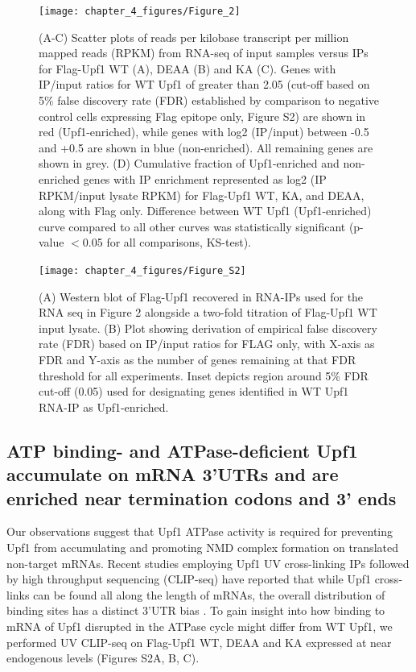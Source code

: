 \begin{figure}[ht]
  \centering
  \texttt{[image: chapter\_4\_figures/Figure\_2]}
  \caption[Figure 1. Selectivity in mRNA association is lost on a transcriptome-wide level in Upf1 ATP binding- and ATP hydrolysis-deficient mutants]{(A-C) Scatter plots of reads per kilobase transcript per million mapped reads (RPKM) from RNA-seq of input samples versus IPs for Flag-Upf1 WT (A), DEAA (B) and KA (C). Genes with IP/input ratios for WT Upf1 of greater than 2.05 (cut-off based on 5\% false discovery rate (FDR) established by comparison to negative control cells expressing Flag epitope only, Figure S2) are shown in red (Upf1-enriched), while genes with log2 (IP/input) between -0.5 and +0.5 are shown in blue (non-enriched). All remaining genes are shown in grey. (D) Cumulative fraction of Upf1-enriched and non-enriched genes with IP enrichment represented as log2 (IP RPKM/input lysate RPKM) for Flag-Upf1 WT, KA, and DEAA, along with Flag only. Difference between WT Upf1 (Upf1-enriched) curve compared to all other curves was statistically significant (p-value $<$0.05 for all comparisons, KS-test). }
  \label{fig:Figure_1}
  \end{figure}

\begin{figure}[ht]
  \centering
  \texttt{[image: chapter\_4\_figures/Figure\_S2]}
  \caption[Supplementary Figure 1. Supplemental data related to RIP-RNAseq]{(A) Western blot of Flag-Upf1 recovered in RNA-IPs used for the RNA seq in Figure 2 alongside a two-fold titration of Flag-Upf1 WT input lysate. (B) Plot showing derivation of empirical false discovery rate (FDR) based on IP/input ratios for FLAG only, with X-axis as FDR and Y-axis as the number of genes remaining at that FDR threshold for all experiments. Inset depicts region around 5\% FDR cut-off (0.05) used for designating genes identified in WT Upf1 RNA-IP as Upf1-enriched. }
  \label{fig:Figure_S1}
\end{figure}

\subsection{ATP binding- and ATPase-deficient Upf1 accumulate on mRNA 3’UTRs and are enriched near termination codons and 3’ ends}
Our observations suggest that Upf1 ATPase activity is required for preventing Upf1 from accumulating and promoting NMD complex formation on translated non-target mRNAs. Recent studies employing Upf1 UV cross-linking IPs followed by high throughput sequencing (CLIP-seq) have reported that while Upf1 cross-links can be found all along the length of mRNAs, the overall distribution of binding sites has a distinct 3’UTR bias \cite{Gregersen2014, Hurt2013, Zund2013}. To gain insight into how binding to mRNA of Upf1 disrupted in the ATPase cycle might differ from WT Upf1, we performed UV CLIP-seq on Flag-Upf1 WT, DEAA and KA expressed at near endogenous levels (Figures S2A, B, C).

